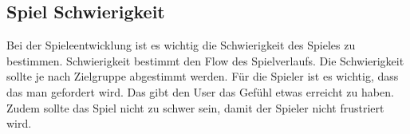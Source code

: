\subsection{Spiel Schwierigkeit}

Bei der Spieleentwicklung ist es wichtig die Schwierigkeit des Spieles zu bestimmen. Schwierigkeit bestimmt den Flow des Spielverlaufs. Die Schwierigkeit sollte je nach Zielgruppe abgestimmt werden. Für die Spieler ist es wichtig, dass das man gefordert wird. Das gibt den User das Gefühl etwas erreicht zu haben. Zudem sollte das Spiel nicht zu schwer sein, damit der Spieler nicht frustriert wird. 

